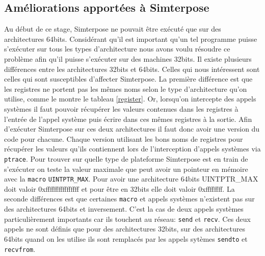 \subsection{Améliorations apportées à Simterpose}

Au début de ce stage, Simterpose ne pouvait être exécuté que sur des architectures 64bits. Considérant qu'il est important qu'un tel programme puisse s'exécuter sur tous les types d'architecture nous avons voulu résoudre ce problème afin qu'il puisse s'exécuter sur des machines 32bits. Il existe plusieurs différences entre les architectures 32bits et 64bits. Celles qui nous intéressent sont celles qui sont susceptibles d'affecter Simterpose. La première différence est que les registres ne portent pas les mêmes noms selon le type d'architecture qu'on utilise, comme le montre le tableau \ref{register}. Or, lorsqu'on intercepte des appels systèmes il faut pouvoir récupérer les valeurs contenues dans les registres à l'entrée de l'appel système puis écrire dans ces mêmes registres à la sortie. Afin d'exécuter Simterpose sur ces deux architectures il faut donc avoir une version du code pour chacune. Chaque version utilisant les bons noms de registres pour récupérer les valeurs qu'ils contiennent lors de l'interception d'appels systèmes via \texttt{ptrace}. Pour trouver sur quelle type de plateforme Simterpose est en train de s'exécuter on teste la valeur maximale que peut avoir un pointeur en mémoire avec la \texttt{macro} \texttt{UINTPTR\_MAX}. Pour avoir une architecture 64bits UINTPTR\_MAX doit valoir 0xffffffffffffffff et pour être en 32bits elle doit valoir 0xffffffff. La seconde différences est que certaines \texttt{macro} et appels systèmes n'existent pas sur des architectures 64bits et inversement. C'est la cas de deux appels systèmes particulièrement importants car ils touchent au réseau: \texttt{send} et \texttt{recv}. Ces deux appels ne sont définis que pour des architectures 32bits, sur des architectures 64bits quand on les utilise ils sont remplacés par les appels sytèmes \texttt{sendto} et \texttt{recvfrom}.

